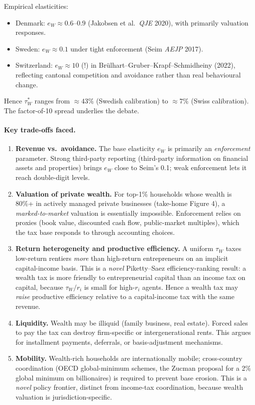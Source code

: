 \documentclass[11pt,a4paper]{article}
\begin{document}
Empirical elasticities:
\begin{itemize}[leftmargin=*,itemsep=1pt]
    \item Denmark: $e_{W}\approx 0.6$--$0.9$ (Jakobsen et al.\ \emph{QJE} 2020), with primarily valuation responses.
    \item Sweden: $e_{W}\approx 0.1$ under tight enforcement (Seim \emph{AEJP} 2017).
    \item Switzerland: $e_{W}\approx 10$ (!) in Brülhart--Gruber--Krapf--Schmidheiny (2022), reflecting cantonal competition and avoidance rather than real behavioural change.
\end{itemize}
Hence $\tau_{W}^{*}$ ranges from $\approx 43\%$ (Swedish calibration) to $\approx 7\%$ (Swiss calibration). The factor-of-10 spread underlies the debate.

\paragraph{Key trade-offs faced.}
\begin{enumerate}[leftmargin=*,itemsep=2pt]
    \item \textbf{Revenue vs.\ avoidance.} The base elasticity $e_{W}$ is primarily an \emph{enforcement} parameter. Strong third-party reporting (third-party information on financial assets and properties) brings $e_{W}$ close to Seim's 0.1; weak enforcement lets it reach double-digit levels.
    \item \textbf{Valuation of private wealth.} For top-1\% households whose wealth is 80\%+ in actively managed private businesses (take-home Figure 4), a \emph{marked-to-market} valuation is essentially impossible. Enforcement relies on proxies (book value, discounted cash flow, public-market multiples), which the tax base responds to through accounting choices.
    \item \textbf{Return heterogeneity and productive efficiency.} A uniform $\tau_{W}$ taxes low-return rentiers \emph{more} than high-return entrepreneurs on an implicit capital-income basis. This is a \emph{novel} Piketty--Saez efficiency-ranking result: a wealth tax is more friendly to entrepreneurial capital than an income tax on capital, because $\tau_{W}/r_{i}$ is small for high-$r_{i}$ agents. Hence a wealth tax may \emph{raise} productive efficiency relative to a capital-income tax with the same revenue.
    \item \textbf{Liquidity.} Wealth may be illiquid (family business, real estate). Forced sales to pay the tax can destroy firm-specific or intergenerational rents. This argues for installment payments, deferrals, or basis-adjustment mechanisms.
    \item \textbf{Mobility.} Wealth-rich households are internationally mobile; cross-country coordination (OECD global-minimum schemes, the Zucman proposal for a 2\% global minimum on billionaires) is required to prevent base erosion. This is a \emph{novel} policy frontier, distinct from income-tax coordination, because wealth valuation is jurisdiction-specific.
\end{enumerate}
\end{document}
